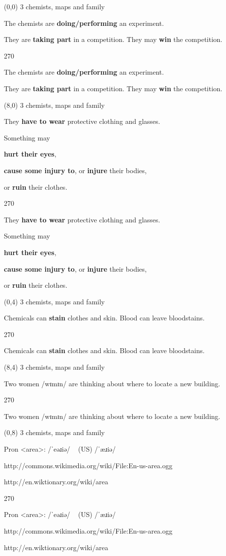 \documentclass[a4paper]{article}
\newenvironment{itemize*}%
{\begin{itemize}%
 \setlength{\itemsep}{0.0cm}%
 \setlength{\parsep}{0pt}%
 \setlength{\parskip}{0pt}}%
{\end{itemize}}
\newcommand{\mycard}[3]{%
	\small #1 #2
	\par
	\parbox[t][6.8cm][c]{9.5cm}{%
	\par
	\myleft{#3}
	\par
	\myright{#3}
	}
}
\newcommand{\myleft}[1]{%
	\begin{sideways}
	\hspace*{-0.9cm}
		\parbox[t][2.7cm][t]{6.5cm}{%
		\Large #1
		}
	\end{sideways}
}
\newcommand{\myright}[1]{%
	\hspace*{6.5cm}
	\begin{turn}{270}
	\hspace*{-7.1cm}
		\parbox[t][2.7cm][t]{6.5cm}{%
		\Large #1
		}
	\end{turn}
}
\begin{document}
\begin{textblock}{8}(0,0)
\mycard{3}{chemists, maps and family}{
\begin{itemize*}
\item The chemists are \textbf{doing/performing} an experiment.
\item They are \textbf{taking part} in a competition. They may \textbf{win} the competition.
\end{itemize*}
}
\end{textblock}

\begin{textblock}{8}(8,0)
\mycard{3}{chemists, maps and family}{
\normalsize
\begin{itemize*}
\item They \textbf{have to wear} protective clothing and glasses.
\item Something may
\begin{itemize*}
\item \textbf{hurt their eyes},
\item \textbf{cause some injury to}, or \textbf{injure} their bodies,
\item or \textbf{ruin} their clothes.
\end{itemize*}
\end{itemize*}
}
\end{textblock}

\begin{textblock}{8}(0,4)
\mycard{3}{chemists, maps and family}{
\begin{itemize*}
\item Chemicals can \textbf{stain} clothes and skin. Blood can leave bloodstains.
\end{itemize*}
}
\end{textblock}

\begin{textblock}{8}(8,4)
\mycard{3}{chemists, maps and family}{
\begin{itemize*}
\item Two women /wɪmɪn/ are thinking about where to locate a new building.
\end{itemize*}
}
\end{textblock}

\begin{textblock}{8}(0,8)
\mycard{3}{chemists, maps and family}{
\begin{itemize*}
\item Pron <area>: /ˈeəɹiə/ ~ (US) /ˈæɹiə/
\item http://commons.wikimedia.org/wiki/File:En-us-area.ogg
\item http://en.wiktionary.org/wiki/area
\end{itemize*}
}
\end{textblock}
\end{document}
